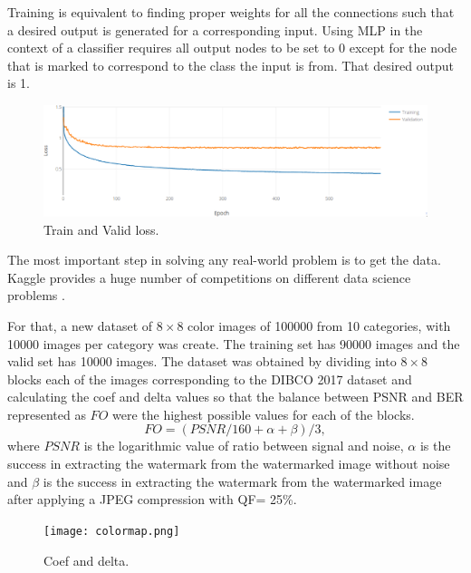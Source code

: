 \documentclass[runningheads]{llncs}
\begin{document}
Training is equivalent to finding proper weights for all the connections such that a desired output is generated for a corresponding input. Using MLP in the context of a classifier requires all output nodes to be set to 0 except for the node that is marked to correspond to the class the input is from. That desired output is 1.

\begin{figure}
	\begin{center}
		\includegraphics[width=\textwidth]{loss.eps}
		\caption{Train and Valid loss.} \label{loss}
	\end{center}
\end{figure} 

The most important step in solving any real-world problem is to get the data. Kaggle provides a huge number of competitions on different data science problems \cite{Subramanian2018}.

For that, a new dataset of $8\times 8$ color images of 100000 from 10 categories, with 10000 images per category was create. The training set has 90000 images and the valid set has 10000 images. The dataset was obtained by dividing into $8\times 8$ blocks each of the images corresponding to the DIBCO 2017 dataset and calculating the coef and delta values so that the balance between PSNR and BER represented as $FO$ were the highest possible values for each of the blocks.
\begin{equation}
FO = (PSNR/160 + \alpha + \beta)/3,
\label{FA}
\end{equation}
where $PSNR$ is the logarithmic value of ratio between signal and noise, $ \alpha $ is the success in extracting the watermark from the watermarked image without noise and $ \beta $ is the success in extracting the watermark from the watermarked image after applying a JPEG compression with QF= 25{\%}.

\begin{figure}
	\begin{center}
		\texttt{[image: colormap.png]}
		\caption{Coef and delta.} \label{colormap}
	\end{center}
\end{figure}
\end{document}
